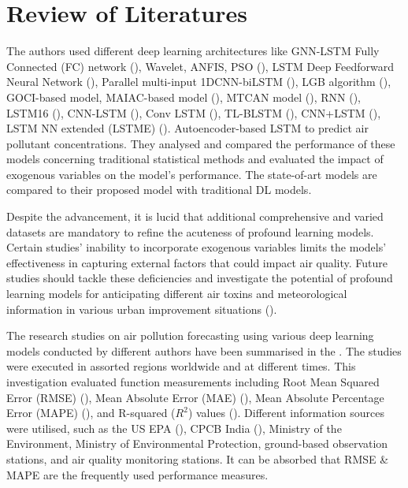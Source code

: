 \documentclass[a4paper, fleqn]{cas-sc}
\theoremstyle{definition}
\theoremstyle{remark}
\begin{document}
\section{Review of Literatures}
The authors used different deep learning architectures like GNN-LSTM Fully Connected (FC) network (\cite{li2023nested}),  Wavelet,  ANFIS,  PSO (\cite{pruthi2022low}),  LSTM Deep Feedforward Neural Network (\cite{menares2021forecasting}),  Parallel multi-input 1DCNN-biLSTM (\cite{zhu2023deep}),  LGB algorithm (\cite{kim2022short}),  GOCI-based model,  MAIAC-based model (\cite{lee2021potential}),  MTCAN model (\cite{samal2021multi}),  RNN (\cite{kurnaz2022prediction}),  LSTM16 (\cite{das2022prediction}),  CNN-LSTM (\cite{natsagdorj2023prediction}),  Conv LSTM (\cite{zhu2023deep}),  TL-BLSTM (\cite{ma2019improving}),  CNN+LSTM (\cite{qin2019novel}),  LSTM NN extended (LSTME) (\cite{li2017long}). Autoencoder-based LSTM to predict air pollutant concentrations. They analysed and compared the performance of these models concerning traditional statistical methods and evaluated the impact of exogenous variables on the model's performance. The state-of-art models are compared to their proposed model with traditional DL models.
\par Despite the advancement,  it is lucid that additional comprehensive and varied datasets are mandatory to refine the acuteness of profound learning models. Certain studies' inability to incorporate exogenous variables limits the models' effectiveness in capturing external factors that could impact air quality. Future studies should tackle these deficiencies and investigate the potential of profound learning models for anticipating different air toxins and meteorological information in various urban improvement situations (\cite{samal2021multi}).
\par The research studies on air pollution forecasting using various deep learning models conducted by different authors have been summarised in the . The studies were executed in assorted regions worldwide and at different times. This investigation evaluated function measurements including Root Mean Squared Error (RMSE) (\cite{das2022prediction, kurnaz2022prediction, samal2021multi, kim2022short, zhu2023investigation, menares2021forecasting, nath2021long, du2019deep, li2017long, qin2019novel, ma2019improving, natsagdorj2023prediction}),  Mean Absolute Error (MAE) (\cite{li2023nested, menares2021forecasting, zhu2023investigation, ma2019improving, nath2021long, du2019deep, li2017long}),  Mean Absolute Percentage Error (MAPE) (\cite{li2017long, ma2019improving}),  and R-squared ($R^2$) values (\cite{eren2023predicting, lee2021potential, kim2022short, zhu2023investigation, menares2021forecasting}). Different information sources were utilised,  such as the US EPA (\cite{li2023nested}),  CPCB India (\cite{nath2021long, samal2021multi, pruthi2022low}),  Ministry of the Environment,  Ministry of Environmental Protection,  ground-based observation stations,  and air quality monitoring stations. It can be absorbed that RMSE \& MAPE are the frequently used performance measures.
\end{document}
